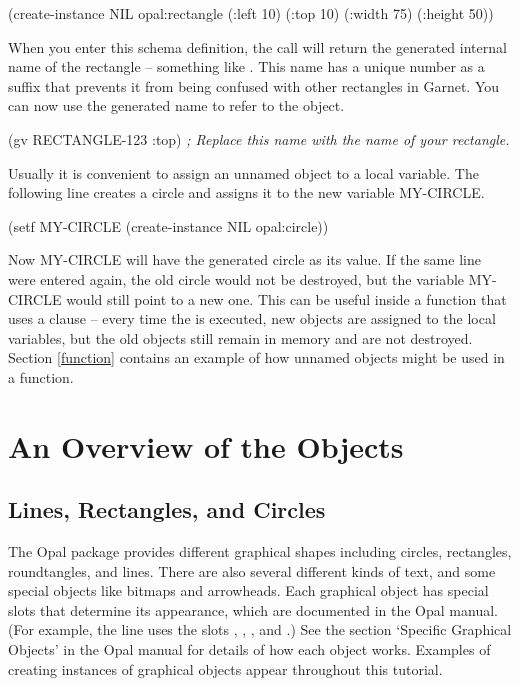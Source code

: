 \begin{programexample}
(create-instance NIL opal:rectangle
   (:left 10) (:top 10) (:width 75) (:height 50))
\end{programexample}

When you enter this schema definition, the  call
will return the generated internal name of the rectangle -- something like
.  This name has a unique number as a
suffix that prevents it from being confused with other rectangles in
Garnet.  You can now use the generated name to refer to the object.

\begin{programexample}
(gv RECTANGLE-123 :top)  {\it ; Replace this name with the name of your rectangle.}
\end{programexample}

Usually it is convenient to assign an unnamed object to a local
variable.  The following line creates a circle and assigns it to the
new variable MY-CIRCLE.

\begin{programexample}
(setf MY-CIRCLE (create-instance NIL opal:circle))
\end{programexample}

Now MY-CIRCLE will have the generated circle as its value.  If the
same line were entered again, the old circle would not be destroyed,
but the variable MY-CIRCLE would still point to a new one.  This can
be useful inside a function that uses a  clause -- every time
the  is executed, new objects are assigned to the local
variables, but the old objects still remain in memory and are not
destroyed. Section \ref{function} contains an example of how unnamed
objects might be used in a function.


\chapter{An Overview of the Objects}

\section{Lines, Rectangles, and Circles}

The Opal package provides different graphical shapes
including circles, rectangles, roundtangles, and lines.  There are
also several different kinds of text, and some special objects like
bitmaps and arrowheads.  Each graphical object has special slots that
determine its appearance, which are documented in the Opal manual.
(For example, the line uses the slots , , ,
and .)
See the section  `Specific Graphical Objects' in the Opal manual for
details of how each object works.  Examples of creating instances of
graphical objects appear throughout this tutorial.


